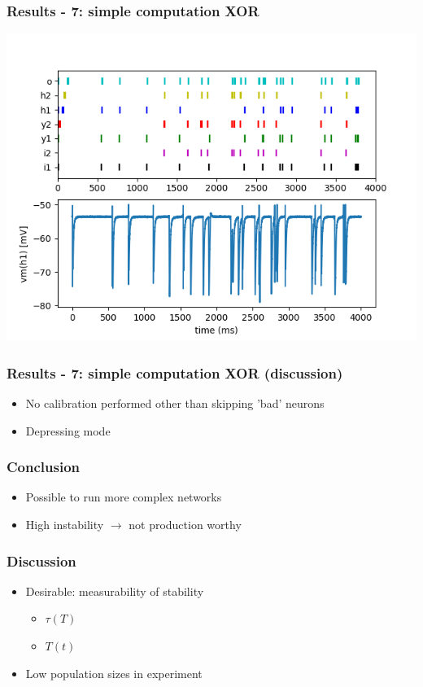 \documentclass{beamer}
\begin{document}
\begin{frame}
    \frametitle{Results - 7: simple computation XOR}
    \includegraphics[width=\textwidth]{figures/XOR-output.png}
\end{frame}

\begin{frame}
    \frametitle{Results - 7: simple computation XOR (discussion)}
    \begin{itemize}
        \item No calibration performed other than skipping 'bad' neurons
        \item Depressing mode
    \end{itemize}
\end{frame}

\begin{frame}
   \frametitle{Conclusion}
   \begin{itemize}
       \item Possible to run more complex networks
       \item High instability $\rightarrow$ not production worthy
   \end{itemize}
\end{frame}

\begin{frame}
    \frametitle{Discussion}
    \begin{itemize}
        \item Desirable: measurability of stability
            \begin{itemize}
                \item $\tau(T)$
                \item $T(t)$
            \end{itemize}
        \item Low population sizes in experiment
    \end{itemize}
\end{frame}
\end{document}
